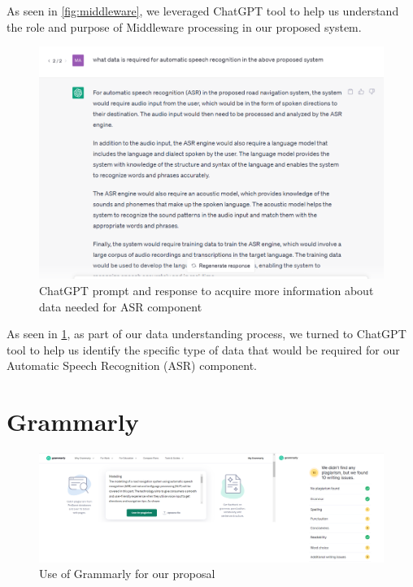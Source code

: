 \documentclass{epsrc}
\begin{document}
As seen in \ref{fig:middleware}, we leveraged ChatGPT tool to help us understand the role and purpose of Middleware processing in our proposed system. 
\newpage

\begin{figure}[hbtp]
    \centering
    \includegraphics[width = 13.5cm]{ASR.png}
    \caption{ChatGPT prompt and response to acquire more information about data needed for ASR component}
    \label{fig:ASR}
\end{figure}


As seen in \ref{fig:ASR}, as part of our data understanding process, we turned to ChatGPT tool to help us identify the specific type of data that would be required for our Automatic Speech Recognition (ASR) component. 
\vspace{5pt}

\section{Grammarly} 
\vspace{5pt}

\begin{figure}[hbtp]
    \centering
    \includegraphics[width = 13.5cm]{Merged_document.png}
    \caption{Use of Grammarly for our proposal}
    \label{fig:Grammarly}
\end{figure}
\vspace{5pt}
\end{document}
